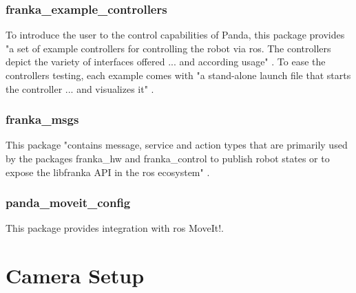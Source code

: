 
\subsubsection*{franka\_example\_controllers}
\label{subsubsec:ros_setup_robotic_system_integration_ros_franka_ros_franka_example_controllers}

To introduce the user to the control capabilities of Panda, this package provides "a set of example controllers for controlling the robot via \gls{ros}. The controllers depict the variety of interfaces offered ... and according usage" \cite{FrankaEmikaGmbH_fci_documentation}. To ease the controllers testing, each example comes with "a stand-alone launch file that starts the controller ... and visualizes it" \cite{FrankaEmikaGmbH_fci_documentation}.


\subsubsection*{franka\_msgs}
\label{subsubsec:ros_setup_robotic_system_integration_ros_franka_ros_franka_msgs}

This package "contains message, service and action types that are primarily used by the packages franka\_hw and franka\_control to publish robot states or to expose the libfranka API in the \gls{ros} ecosystem" \cite{FrankaEmikaGmbH_fci_documentation}.


\subsubsection*{panda\_moveit\_config}
\label{subsubsec:ros_setup_robotic_system_integration_ros_franka_ros_panda_moveit_config}

This package provides integration with \gls{ros} MoveIt!.\\



\section{Camera Setup}
\label{sec:ros_setup_camera}

